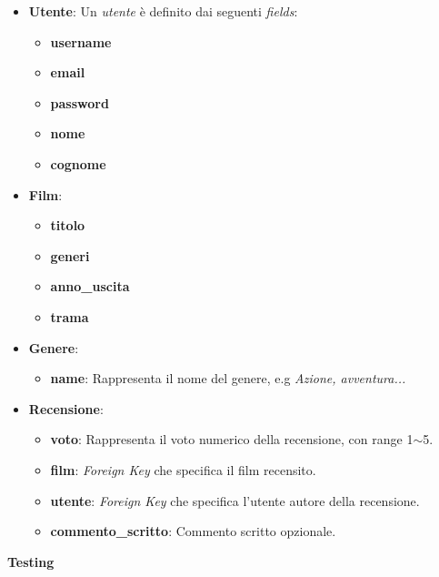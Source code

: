 \documentclass[12pt]{article}
\begin{document}
	\begin{itemize}
		\item \textbf{Utente}: Un \textit{utente} è definito dai seguenti \textit{fields}:
		\begin{itemize}
			\item \textbf{username}
			\item \textbf{email}
			\item \textbf{password}
			\item \textbf{nome}
			\item \textbf{cognome} \\
		\end{itemize}
		
		\item \textbf{Film}:
		\begin{itemize}
			\item \textbf{titolo}
			\item \textbf{generi}
			\item \textbf{anno\_uscita}
			\item \textbf{trama} \\
		\end{itemize}
		
		
		\item \textbf{Genere}:
		\begin{itemize}
			\item \textbf{name}: Rappresenta il nome del genere, e.g \textit{Azione, avventura...} \\
		\end{itemize}
		
		
		
		\item \textbf{Recensione}:
		\begin{itemize}
			\item \textbf{voto}: Rappresenta il voto numerico della recensione, con range 1$\sim$5.
			\item \textbf{film}: \textit{Foreign Key} che specifica il film recensito.
			\item \textbf{utente}: \textit{Foreign Key} che specifica l'utente autore della recensione.
			\item \textbf{commento\_scritto}: Commento scritto opzionale.
		\end{itemize}
	\end{itemize}
	\pagebreak
	
	
	\noindent \centerline {\Huge \textbf{Testing}} \\
	
\end{document}
